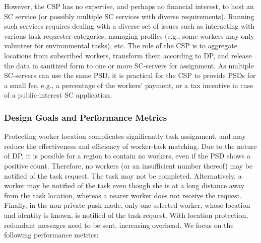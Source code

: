 \documentclass{USC-Thesis}
\numberwithin{equation}{chapter}
\begin{document}
However, the CSP has no expertise, and perhaps no financial interest, to host an SC service (or possibly multiple SC services with diverse requirements). Running such services requires dealing with a diverse set of issues such as interacting with various task requester categories, managing profiles (e.g., some workers may only volunteer for environmental tasks), etc. The role of the CSP is to aggregate locations from subscribed workers, transform them according to DP, and release the data in sanitized form to one or more SC-servers for assignment. As multiple SC-servers can use the same PSD, it is practical for the CSP to provide PSDs for a small fee, e.g., a percentage of the workers' payment, or a tax incentive in case of a public-interest SC application.

\subsubsection{Design Goals and Performance Metrics}
\label{sec:metrics1}
Protecting worker location complicates significantly task assignment, and may reduce the effectiveness and efficiency of worker-task matching. Due to the nature of DP, it is possible for a region to contain no workers, even if the PSD shows a positive count. Therefore, no workers (or an insufficient number thereof) may be notified of the task request. The task may not be completed. Alternatively, a worker may be notified of the task even though she is at a long distance away from the task location, whereas a nearer worker does not receive the request. 
Finally, in the non-private push mode, only one selected worker, whose location and identity is known, is notified of the task request. 
With location protection, redundant messages need to be sent, increasing overhead.
We focus on the following performance metrics:
\end{document}
